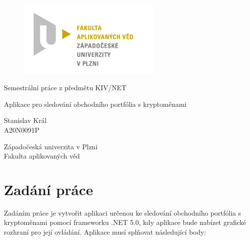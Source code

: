 \documentclass[12pt, a4paper]{article}
\begin{document}
    \renewcommand{\lstlistingname}{Ukázka kódu}
    \renewcommand{\lstlistlistingname}{Seznam ukázek kódu}
    \begin{titlepage}

        \centering

        \vspace*{\baselineskip}
        \begin{figure}[H]
            \centering
            \includegraphics[width=7cm]{img/fav-logo.jpg}
        \end{figure}

        \vspace*{1\baselineskip}

        \vspace{0.75\baselineskip}

        \vspace{0.5\baselineskip}
        {Semestrální práce z předmětu KIV/NET}

        {\LARGE\sc Aplikace pro sledování obchodního portfólia s kryptoměnami \\}

        \vspace{4\baselineskip}

        \vspace{0.5\baselineskip}

        {\sc\Large Stanislav Král \\}
        \vspace{0.5\baselineskip}
        {A20N0091P}

        \vfill

        {\sc Západočeská univerzita v Plzni\\
        Fakulta aplikovaných věd}

    \end{titlepage}


    \tableofcontents
    \pagebreak


    \section{Zadání práce}
    Zadáním práce je vytvořit aplikaci určenou ke sledování obchodního portfólia s kryptoměnami pomocí frameworku .NET 5.0, kdy aplikace bude nabízet grafické rozhraní pro její ovládání. Aplikace musí splňovat následující body:
\end{document}
